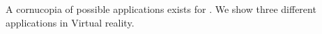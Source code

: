 
A cornucopia of possible applications exists for \devicename{}. We show three different applications in Virtual reality.





